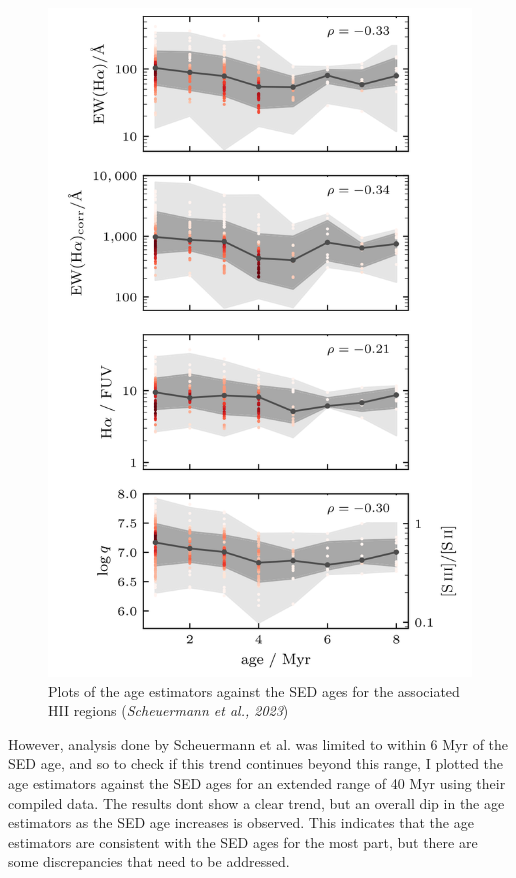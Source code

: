 \documentclass[12pt]{report}
\begin{document}
\begin{figure}[H]
    \centering
    \includegraphics[scale = 0.3]{image17.png}
    \caption{Plots of the age estimators against the SED ages for the associated HII regions (\textit{Scheuermann et al., 2023})}
    \label{fig:image17}
\end{figure}


However, analysis done by Scheuermann et al. was limited to within 6 Myr of the SED age, and so to check if this trend continues beyond this range, I plotted the age estimators against the SED ages for an extended range of 40 Myr using their compiled data. The results dont show a clear trend, but an overall dip in the age estimators as the SED age increases is observed. This indicates that the age estimators are consistent with the SED ages for the most part, but there are some discrepancies that need to be addressed.
\end{document}
